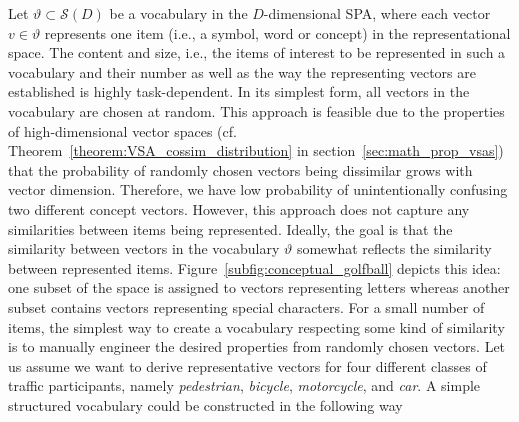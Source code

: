 Let $\vartheta \subset \mathcal{S}(D)$ be a vocabulary in the $D$-dimensional \ac{SPA}, where each vector $v \in \vartheta$ represents one item (i.e., a symbol, word or concept) in the representational space.
The content and size, i.e., the items of interest to be represented in such a vocabulary and their number as well as the way the representing vectors are established is highly task-dependent.
In its simplest form, all vectors in the vocabulary are chosen at random.
This approach is feasible due to the properties of high-dimensional vector spaces (cf. Theorem~\ref{theorem:VSA_cossim_distribution} in section~\ref{sec:math_prop_vsas}) that the probability of randomly chosen vectors being dissimilar grows with vector dimension.
Therefore,  we have low probability of unintentionally confusing two different concept vectors.
However, this approach does not capture any similarities between items being represented.
Ideally, the goal is that the similarity between vectors in the vocabulary $\vartheta$ somewhat reflects the similarity between represented items.
Figure~\ref{subfig:conceptual_golfball} depicts this idea: one subset of the space is assigned to vectors representing letters whereas another subset contains vectors representing special characters.
For a small number of items, the simplest way to create a vocabulary respecting some kind of similarity is to manually engineer the desired properties from randomly chosen vectors.
Let us assume we want to derive representative vectors for four different classes of traffic participants, namely \emph{pedestrian}, \emph{bicycle}, \emph{motorcycle},  and \emph{car}.
A simple structured vocabulary could be constructed in the following way

